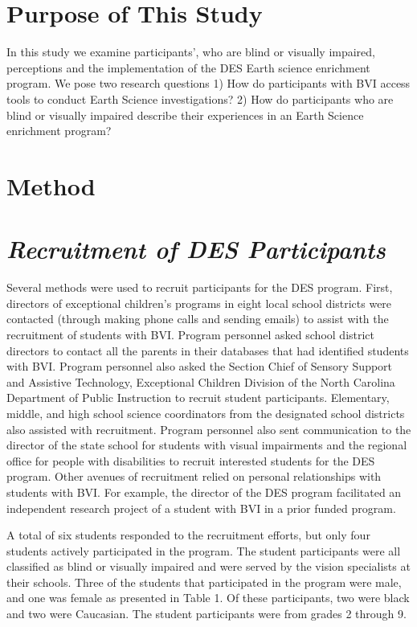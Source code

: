 \documentclass[11.5pt]{sig-alternate}
\begin{document}
\begin{large}
\section*{Purpose of This Study}
In this study we examine participants’, who are blind or visually impaired, perceptions and the implementation of the DES Earth science enrichment program. We pose two research questions 1) How do participants with BVI access tools to conduct Earth Science investigations? 2) How do participants who are blind or visually impaired describe their experiences in an Earth Science enrichment program?

\section*{Method}
\section*{\textit{Recruitment of DES Participants}}
Several methods were used to recruit participants for the DES program. First, directors of exceptional children’s programs in eight local school districts were contacted (through making phone calls and sending emails) to assist with the recruitment of students with BVI. Program personnel asked school district directors to contact all the parents in their databases that had identified students with BVI. Program personnel also asked the Section Chief of Sensory Support and Assistive Technology, Exceptional Children Division of the North Carolina Department of Public Instruction to recruit student participants.  Elementary, middle, and high school science coordinators from the designated school districts also assisted with recruitment. Program personnel also sent communication to the director of the state school for students with visual impairments and the regional office for people with disabilities to recruit interested students for the DES program. Other avenues of recruitment relied on personal relationships with students with BVI. For example, the director of the DES program facilitated an independent research project of a student with BVI in a prior funded program. 

A total of six students responded to the recruitment efforts, but only four students actively participated in the program. The student participants were all classified as blind or visually impaired and were served by the vision specialists at their schools. Three of the students that participated in the program were male, and one was female as presented in Table 1. Of these participants, two were black and two were Caucasian. The student participants were from grades 2 through 9.


\end{large}
\end{document}
